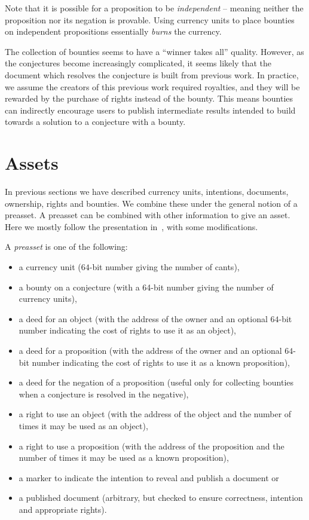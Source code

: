 \documentclass{article}
\begin{document}
Note that it is possible for a proposition to be {\em{independent}} -- meaning
neither the proposition nor its negation is provable.
Using currency units to place bounties on independent propositions
essentially {\em{burns}} the currency.

The collection of bounties seems to have a ``winner takes all'' quality. However, as the conjectures become increasingly complicated, it seems likely that
the document which resolves the conjecture is built from previous work. In
practice, we assume the creators of this previous work required royalties, and
they will be rewarded by the purchase of rights instead of the bounty. This
means bounties can indirectly encourage users to publish intermediate results
intended to build towards a solution to a conjecture with a bounty.

\section{Assets}\label{sec:assets}

In previous sections we have described currency units, intentions, documents, ownership, rights and bounties.
We combine these under the general notion of a preasset.
A preasset can be combined with other information to give an asset.
Here we mostly follow the presentation in~\cite{White2015b}, with some modifications.

A {\em{preasset}} is one of the following:
\begin{itemize}
\item a currency unit ($64$-bit number giving the number of cants),
\item a bounty on a conjecture (with a 64-bit number giving the number of currency units),
\item a deed for an object (with the address of the owner and an optional $64$-bit number indicating the cost of rights to use it as an object),
\item a deed for a proposition (with the address of the owner and an optional $64$-bit number indicating the cost of rights to use it as a known proposition),
\item a deed for the negation of a proposition (useful only for collecting bounties when a conjecture is resolved in the negative),
\item a right to use an object (with the address of the object and the number of times it may be used as an object),
\item a right to use a proposition (with the address of the proposition and the number of times it may be used as a known proposition),
\item a marker to indicate the intention to reveal and publish a document or
\item a published document (arbitrary, but checked to ensure correctness, intention and appropriate rights).
\end{itemize}
\end{document}
